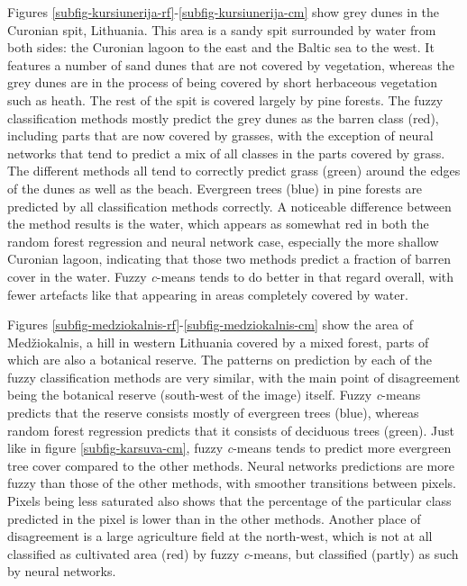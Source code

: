 \documentclass[a4paper,12pt]{scrbook}
\begin{document}
Figures \ref{subfig-kursiunerija-rf}-\ref{subfig-kursiunerija-cm} show grey dunes in the Curonian spit, Lithuania. This area is a sandy spit surrounded by water from both sides: the Curonian lagoon to the east and the Baltic sea to the west. It features a number of sand dunes that are not covered by vegetation, whereas the grey dunes are in the process of being covered by short herbaceous vegetation such as heath. The rest of the spit is covered largely by pine forests. The fuzzy classification methods mostly predict the grey dunes as the barren class (red), including parts that are now covered by grasses, with the exception of neural networks that tend to predict a mix of all classes in the parts covered by grass. The different methods all tend to correctly predict grass (green) around the edges of the dunes as well as the beach. Evergreen trees (blue) in pine forests are predicted by all classification methods correctly. A noticeable difference between the method results is the water, which appears as somewhat red in both the random forest regression and neural network case, especially the more shallow Curonian lagoon, indicating that those two methods predict a fraction of barren cover in the water. Fuzzy \textit{c}-means tends to do better in that regard overall, with fewer artefacts like that appearing in areas completely covered by water.

Figures \ref{subfig-medziokalnis-rf}-\ref{subfig-medziokalnis-cm} show the area of Med\v{z}iokalnis, a hill in western Lithuania covered by a mixed forest, parts of which are also a botanical reserve. The patterns on prediction by each of the fuzzy classification methods are very similar, with the main point of disagreement being the botanical reserve (south-west of the image) itself. Fuzzy \textit{c}-means predicts that the reserve consists mostly of evergreen trees (blue), whereas random forest regression predicts that it consists of deciduous trees (green). Just like in figure \ref{subfig-karsuva-cm}, fuzzy \textit{c}-means tends to predict more evergreen tree cover compared to the other methods. Neural networks predictions are more fuzzy than those of the other methods, with smoother transitions between pixels. Pixels being less saturated also shows that the percentage of the particular class predicted in the pixel is lower than in the other methods. Another place of disagreement is a large agriculture field at the north-west, which is not at all classified as cultivated area (red) by fuzzy \textit{c}-means, but classified (partly) as such by neural networks.
\end{document}
